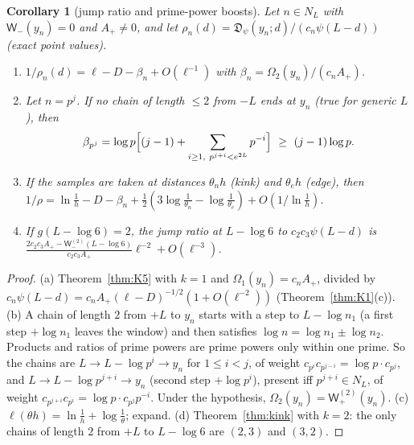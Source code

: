 \documentclass[11pt]{amsart}
\newcommand{\Dj}{\mathfrak{D}}
\newtheorem{corollary}[theorem]{Corollary}
\theoremstyle{definition}
\theoremstyle{remark}
\numberwithin{equation}{section}
\begin{document}
\begin{corollary}[jump ratio and prime-power boosts]\label{cor:K6}
Let $n\in N_L$ with $\mathsf W_-(y_n)=0$ and $A_+\ne0$, and let $\rho_n(d)=\Dj_\psi(y_n;d)/(c_n\psi(L-d))$ (exact point values).
\begin{enumerate}
\item[(a)] $1/\rho_n(d)=\ell-D-\beta_n+O(\ell^{-1})$ with $\beta_n=\Omega_2(y_n)/(c_nA_+)$.
\item[(b)] Let $n=p^j$. If no chain of length $\le2$ from $-L$ ends at $y_n$ (true for generic $L$), then
\[
\beta_{p^j}=\log p\Bigl[(j-1)+\sum_{i\ge1,\ p^{j+i}<e^{2L}}p^{-i}\Bigr]\ \ge\ (j-1)\log p .
\]
\item[(c)] If the samples are taken at distances $\theta_nh$ (kink) and $\theta_eh$ (edge), then $1/\rho=\ln\frac1h-D-\beta_n+\frac12(3\log\frac1{\theta_n}-\log\frac1{\theta_e})+O(1/\ln\frac1h)$.
\item[(d)] If $g(L-\log6)=2$, the jump ratio at $L-\log6$ to $c_2c_3\psi(L-d)$ is $\frac{2c_2c_3A_+-\mathsf W_-^{(2)}(L-\log6)}{c_2c_3A_+}\ell^{-2}+O(\ell^{-3})$.
\end{enumerate}
\end{corollary}

\begin{proof}
(a) Theorem~\ref{thm:K5} with $k=1$ and $\Omega_1(y_n)=c_nA_+$, divided by $c_n\psi(L-d)=c_nA_+(\ell-D)^{-1/2}(1+O(\ell^{-2}))$ (Theorem~\ref{thm:K1}(c)). (b) A chain of length $2$ from $+L$ to $y_n$ starts with a step to $L-\log n_1$ (a first step $+\log n_1$ leaves the window) and then satisfies $\log n=\log n_1\pm\log n_2$. Products and ratios of prime powers are prime powers only within one prime. So the chains are $L\to L-\log p^i\to y_n$ for $1\le i<j$, of weight $c_{p^i}c_{p^{j-i}}=\log p\cdot c_{p^j}$, and $L\to L-\log p^{j+i}\to y_n$ (second step $+\log p^i$), present iff $p^{j+i}\in N_L$, of weight $c_{p^{j+i}}c_{p^i}=\log p\cdot c_{p^j}p^{-i}$. Under the hypothesis, $\Omega_2(y_n)=\mathsf W^{(2)}_+(y_n)$. (c) $\ell(\theta h)=\ln\frac1h+\log\frac1\theta$; expand. (d) Theorem~\ref{thm:kink} with $k=2$: the only chains of length $2$ from $+L$ to $L-\log6$ are $(2,3)$ and $(3,2)$.
\end{proof}
\end{document}

